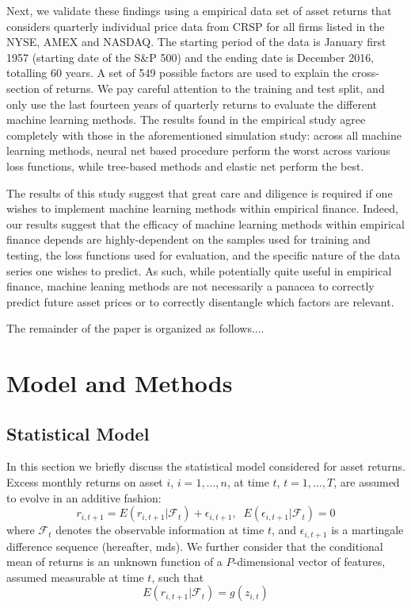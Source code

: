 \documentclass{article}
\begin{document}
Next, we validate these findings using a empirical data set of asset returns that considers quarterly individual price data from CRSP for all firms listed in the NYSE, AMEX and NASDAQ. The starting period of the data is January first 1957 (starting date of the S\&P 500) and the ending date is December 2016, totalling 60 years. A set of 549 possible factors are used to explain the cross-section of returns. We pay careful attention to the training and test split, and only use the last fourteen years of quarterly returns to evaluate the different machine learning methods. The results found in the empirical study agree completely with those in the aforementioned simulation study: across all machine learning methods, neural net based procedure perform the worst across various loss functions, while tree-based methods and elastic net perform the best. 

The results of this study suggest that great care and diligence is required if one wishes to implement machine learning methods within empirical finance. Indeed, our results suggest that the efficacy of machine learning methods within empirical finance depends are highly-dependent on the samples used for training and testing, the loss functions used for evaluation, and the specific nature of the data series one wishes to predict. As such, while potentially quite useful in empirical finance, machine leaning methods are not necessarily a panacea to correctly predict future asset prices or to correctly disentangle which factors are relevant. 

The remainder of the paper is organized as follows.... 

\section{Model and Methods}
\subsection{Statistical Model}
In this section we briefly discuss the statistical model considered for asset returns. Excess monthly returns on asset $i$, $i=1,\dots,n$, at time $t$, $t=1,\dots,T$, are assumed to evolve in an additive fashion:
\begin{equation}\label{eq:model}
r_{i, t+1} = E(r_{i, t+1} | \mathcal{F}_t) + \epsilon_{i, t+1},\;\;E(\epsilon_{i, t+1}|\mathcal{F}_{t})=0
\end{equation} where $\mathcal{F}_t$ denotes the observable information at time $t$, and $\epsilon_{i,t+1}$ is a martingale difference sequence (hereafter, mds). We further consider that the conditional mean of returns is an unknown function of a $P$-dimensional vector of features, assumed measurable at time $t$, such that 
\begin{equation}
E(r_{i, t+1} | \mathcal{F}_t) = g(z_{i,t})
\end{equation} 
\end{document}
